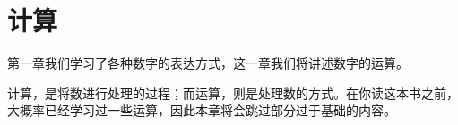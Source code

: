 \chapter{计算}\label{ch:Calculations}
    第一章我们学习了各种数字的表达方式，这一章我们将讲述数字的运算。

    计算，是将数进行处理的过程；而运算，则是处理数的方式。在你读这本书之前，大概率已经学习过一些运算，因此本章将会跳过部分过于基础的内容。

